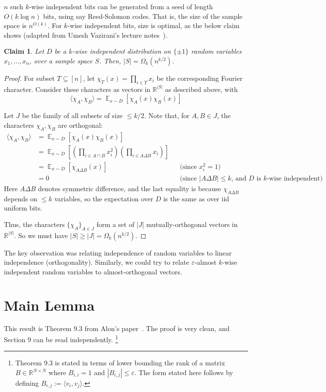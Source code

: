 \documentclass[]{article}
\newtheorem{claim}[theorem]{Claim}
\newcommand{\1}{\mathbb{1}}
\newcommand{\x}{\times}
\newcommand{\R}{\mathbb{R}}
\newcommand{\E}{\mathop{\mathbb{E}}}
\renewcommand{\epsilon}{\varepsilon}
\newcommand{\innp}[1]{\langle #1 \rangle}
\newcommand{\note}[1]{&&\text{(#1)}}
\begin{document}
$n$ such $k$-wise independent bits can be generated from a seed of length $O(k \log n)$ bits, using say Reed-Solomon codes.
That is, the size of the sample space is $n^{O(k)}$.
For $k$-wise independent bits, size is optimal, as the below claim shows
(adapted from Umesh Vazirani's lecture notes~\cite{umesh_notes}).
\begin{claim}
    \label{claim:kwise}
    Let $D$ be a $k$-wise independent distribution on $\{\pm 1\}$ random
    variables $x_1, \dots, x_n$, over a sample space $S$.
    Then, $|S| = \Omega_k(n^{k / 2})$.
\end{claim}

\begin{proof}
    For subset $T \subseteq [n]$, let $\chi_T(x) = \prod_{i \in T} x_i$ be the
    corresponding Fourier character.
    Consider these characters as vectors in $\R^{|S|}$ as described above, with
    $$\innp{\chi_A, \chi_B} = \E_{x \sim D}[\chi_A(x)\chi_B(x)] $$

    Let $J$ be the family of all subsets of size $\leq k/2$.
    Note that, for $A, B \in J$, the characters $\chi_A, \chi_B$ are orthogonal:
    \begin{align*}
     \innp{\chi_A, \chi_B}
     &= \E_{x \sim D}[\chi_A(x)\chi_B(x)]\\
     &= \E_{x \sim D}[(\prod_{i \in A \cap B} x_i^2)(\prod_{i \in A \Delta B}
 x_i)]\\
 &= \E_{x \sim D}[\chi_{A \Delta B}(x)] \note{since $x_i^2 = 1$}\\
 &= 0 \note{since $|A \Delta B| \leq k$, and $D$ is $k$-wise independent}
\end{align*}
    Here $A \Delta B$ denotes symmetric difference, and the last equality
    is because $\chi_{A \Delta B}$ depends on $\leq k$
    variables, so the
    expectation over $D$ is the same as over iid uniform bits.

    Thus, the characters $\{\chi_A\}_{A \in J}$ form a set of
    $|J|$ mutually-orthogonal vectors in $\R^{|S|}$.
    So we must have $|S| \geq |J| = \Omega_k(n^{k/2})$.
\end{proof}

The key observation was relating independence of random
variables to linear independence (orthogonality).
Similarly, we could try to relate $\epsilon$-almost $k$-wise independent
random variables to almost-orthogonal vectors.

\section{Main Lemma}
This result is Theorem 9.3 from Alon's paper~\cite{alon03}.
The proof is very clean, and Section 9 can be read independently.
\footnote{
Theorem 9.3 is stated in terms of lower bounding the rank of a matrix $B \in
\R^{N \x N}$ where $B_{i,i} = 1$ and $|B_{i, j}| \leq \epsilon$.
The form stated here follows by defining $B_{i, j} := \innp{v_i, v_j}$.
}
\end{document}
